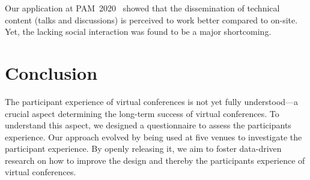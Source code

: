 \documentclass[sigconf]{acmart}
\begin{document}
Our application at PAM~2020~\cite{pamexperience} showed that the dissemination of technical content (talks and discussions) is perceived to work better compared to on-site.
Yet, the lacking social interaction was found to be a major shortcoming.

\section{Conclusion}
The participant experience of virtual conferences is not yet fully understood---a crucial aspect determining the long-term success of virtual conferences.
To understand this aspect, we designed a questionnaire to assess the participants experience.
Our approach evolved by being used at five venues to investigate the participant experience.
By openly releasing it, we aim to foster data-driven research on how to improve the design and thereby the participants experience of virtual conferences.

\balance

\clearpage


\end{document}
